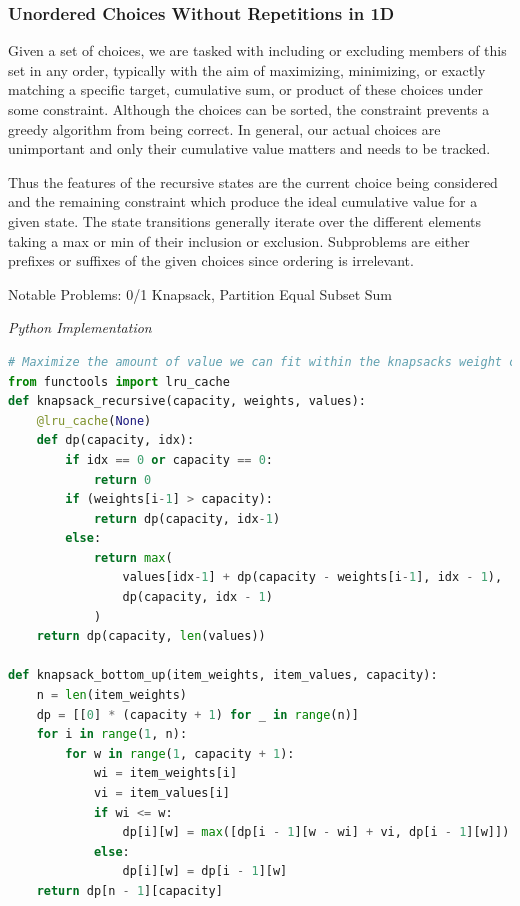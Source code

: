 \documentclass{article}
\newcommand{\comment}[1]{}
\begin{document}
\subsubsection*{Unordered Choices Without Repetitions in 1D}

\comment{
Input: choice array can be reordered, constraint 

dimension doesn't matter much

though a greedy heuristic may improve the time taken for an exhaustive search to find an optimal solution in which case we would want to sort our choices in descending order

Given a knapsack with a maximum weight capacity and a list of items with value and weights, maximize the amount of value we can fit within the knapsacks weight capacity.

TC: O(N*M), SC: O(N)
}

Given a set of choices, we are tasked with including or excluding members of this set in any order, typically with the aim of maximizing, minimizing, or exactly matching a specific target, cumulative sum, or product of these choices under some constraint. Although the choices can be sorted, the constraint prevents a greedy algorithm from being correct. In general, our actual choices are unimportant and only their cumulative value matters and needs to be tracked. 

Thus the features of the recursive states are the current choice being considered and the remaining constraint which produce the ideal cumulative value for a given state. The state transitions generally iterate over the different elements taking a max or min of their inclusion or exclusion. Subproblems are either prefixes or suffixes of the given choices since ordering is irrelevant.

Notable Problems: 0/1 Knapsack, Partition Equal Subset Sum

\vspace{8pt} \emph{Python Implementation}
\begin{lstlisting}[language=Python]
# Maximize the amount of value we can fit within the knapsacks weight capacity
from functools import lru_cache
def knapsack_recursive(capacity, weights, values):
    @lru_cache(None)
    def dp(capacity, idx):
        if idx == 0 or capacity == 0:
            return 0
        if (weights[i-1] > capacity):
            return dp(capacity, idx-1)
        else:
            return max(
                values[idx-1] + dp(capacity - weights[i-1], idx - 1),
                dp(capacity, idx - 1)
            )
    return dp(capacity, len(values))

def knapsack_bottom_up(item_weights, item_values, capacity):
    n = len(item_weights)
    dp = [[0] * (capacity + 1) for _ in range(n)]
    for i in range(1, n):
        for w in range(1, capacity + 1):
            wi = item_weights[i]
            vi = item_values[i]
            if wi <= w:
                dp[i][w] = max([dp[i - 1][w - wi] + vi, dp[i - 1][w]])
            else:
                dp[i][w] = dp[i - 1][w]
    return dp[n - 1][capacity]
\end{lstlisting}
\end{document}
